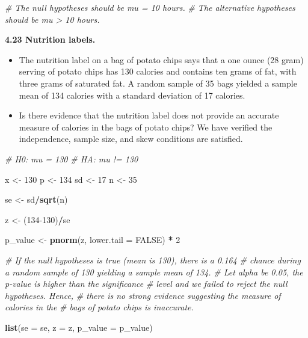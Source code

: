 \documentclass[]{book}
\newenvironment{Shaded}{\begin{snugshade}}{\end{snugshade}}
\newcommand{\CommentTok}[1]{\textcolor[rgb]{0.56,0.35,0.01}{\textit{#1}}}
\newcommand{\DataTypeTok}[1]{\textcolor[rgb]{0.13,0.29,0.53}{#1}}
\newcommand{\DecValTok}[1]{\textcolor[rgb]{0.00,0.00,0.81}{#1}}
\newcommand{\KeywordTok}[1]{\textcolor[rgb]{0.13,0.29,0.53}{\textbf{#1}}}
\newcommand{\NormalTok}[1]{#1}
\newcommand{\OperatorTok}[1]{\textcolor[rgb]{0.81,0.36,0.00}{\textbf{#1}}}
\newcommand{\OtherTok}[1]{\textcolor[rgb]{0.56,0.35,0.01}{#1}}
\newcommand{\StringTok}[1]{\textcolor[rgb]{0.31,0.60,0.02}{#1}}
\providecommand{\tightlist}{%
  \setlength{\itemsep}{0pt}\setlength{\parskip}{0pt}}
\begin{document}
\begin{Shaded}
\begin{Highlighting}[]
\CommentTok{# The null hypotheses should be mu = 10 hours.}
\CommentTok{# The alternative hypotheses should be mu > 10 hours.}
\end{Highlighting}
\end{Shaded}

\textbf{4.23 Nutrition labels.}

\begin{itemize}
\tightlist
\item
  The nutrition label on a bag of potato chips says that a one ounce
  (28 gram) serving of potato chips has 130 calories and contains ten grams of fat, with three grams
  of saturated fat. A random sample of 35 bags yielded a sample mean of 134 calories with a standard
  deviation of 17 calories.
\item
  Is there evidence that the nutrition label does not provide an accurate
  measure of calories in the bags of potato chips? We have verified the independence, sample size,
  and skew conditions are satisfied.
\end{itemize}

\begin{Shaded}
\begin{Highlighting}[]
\CommentTok{# H0: mu = 130}
\CommentTok{# HA: mu != 130}

\NormalTok{x <-}\StringTok{ }\DecValTok{130}
\NormalTok{p <-}\StringTok{ }\DecValTok{134}
\NormalTok{sd <-}\StringTok{ }\DecValTok{17}
\NormalTok{n <-}\StringTok{ }\DecValTok{35}

\NormalTok{se <-}\StringTok{ }\NormalTok{sd}\OperatorTok{/}\KeywordTok{sqrt}\NormalTok{(n)}

\NormalTok{z <-}\StringTok{ }\NormalTok{(}\DecValTok{134-130}\NormalTok{)}\OperatorTok{/}\NormalTok{se}

\NormalTok{p_value <-}\StringTok{ }\KeywordTok{pnorm}\NormalTok{(z, }\DataTypeTok{lower.tail =} \OtherTok{FALSE}\NormalTok{) }\OperatorTok{*}\StringTok{ }\DecValTok{2}

\CommentTok{# If the null hypotheses is true (mean is 130), there is a 0.164}
\CommentTok{# chance during a random sample of 130 yielding a sample mean of 134.}
\CommentTok{# Let alpha be 0.05, the p-value is higher than the significance}
\CommentTok{# level and we failed to reject the null hypotheses. Hence,}
\CommentTok{# there is no strong evidence suggesting the measure of calories in the}
\CommentTok{# bags of potato chips is inaccurate.}

\KeywordTok{list}\NormalTok{(}\DataTypeTok{se =}\NormalTok{ se, }\DataTypeTok{z =}\NormalTok{ z, }\DataTypeTok{p_value =}\NormalTok{ p_value)}
\end{Highlighting}
\end{Shaded}
\end{document}
